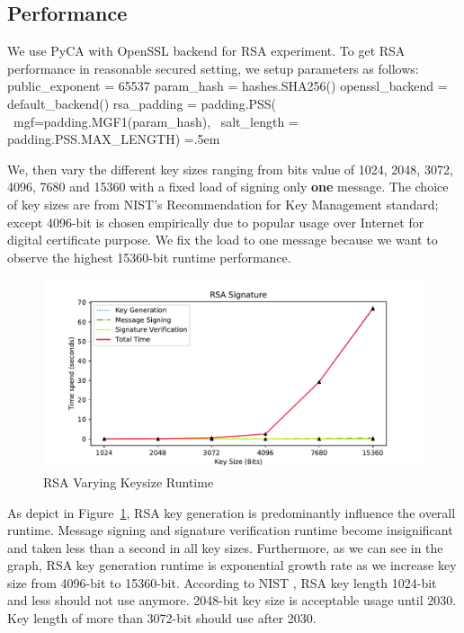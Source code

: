 \documentclass[10pt,sigconf]{acmart}
\newenvironment{lcverbatim}
 {\SaveVerbatim{cverb}}
 {\endSaveVerbatim
  \flushleft\fboxrule=0pt\fboxsep=.5em
  \colorbox{cverbbg}{%
    \makebox[\dimexpr\linewidth-2\fboxsep][l]{\BUseVerbatim{cverb}}%
  }
  \endflushleft
}
\begin{document}
\subsection{Performance}

We use PyCA \cite{PyCACryptography} with OpenSSL backend for RSA experiment. To get RSA performance in reasonable secured setting, we setup parameters as follows:
\small{
\begin{lcverbatim}
public_exponent = 65537
param_hash = hashes.SHA256()
openssl_backend = default_backend()
rsa_padding = padding.PSS( \
    mgf=padding.MGF1(param_hash), \
    salt_length = padding.PSS.MAX_LENGTH)
\end{lcverbatim}
}

We, then vary the different key sizes ranging from bits value of 1024, 2048, 3072, 4096, 7680 and 15360 with a fixed load of signing only \textbf{one} message. The choice of key sizes are from NIST's 
Recommendation for Key Management \cite{nistKeysizes} standard; except 4096-bit is chosen empirically due to popular usage over Internet for digital certificate purpose. We fix the load to one message because we want to observe the highest 15360-bit runtime performance.

\begin{figure}
\centering
\includegraphics[scale=0.45]{RSA_Varying_Keysize_Runtime_Graph}
\caption{\small{RSA Varying Keysize Runtime}}
\label{fig:RSA_Varying_Keysize_Runtime_Graph}
\end{figure}

As depict in Figure~\ref{fig:RSA_Varying_Keysize_Runtime_Graph}, RSA key generation is predominantly influence the overall runtime. Message signing and signature verification runtime become insignificant and taken less than a second in all key sizes. Furthermore, as we can see in the graph, RSA key generation runtime is exponential growth rate as we increase key size from 4096-bit to 15360-bit. According to NIST \cite{nistKeysizes}, RSA key length 1024-bit and less should not use anymore. 2048-bit key size is acceptable usage until 2030. Key length of more than 3072-bit should use after 2030.
\end{document}
